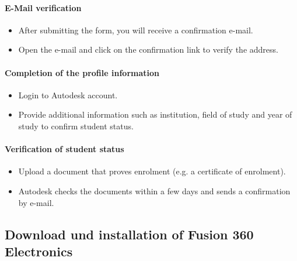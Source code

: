 \paragraph{  E-Mail verification}
\begin{itemize}
	\item After submitting the form, you will receive a confirmation e-mail.
	\item Open the e-mail and click on the confirmation link to verify the address.%
\end{itemize}

\paragraph{ Completion of the profile information}
\begin{itemize}
	\item Login to Autodesk account.
	\item Provide additional information such as institution, field of study and year of study to confirm student status.
\end{itemize}

\paragraph*{ Verification of student status}
\begin{itemize}
		\item Upload a document that proves enrolment (e.g. a certificate of enrolment).
	\item Autodesk checks the documents within a few days and sends a confirmation by e-mail.
\end{itemize}

\subsection*{Download und installation of Fusion 360 Electronics}

